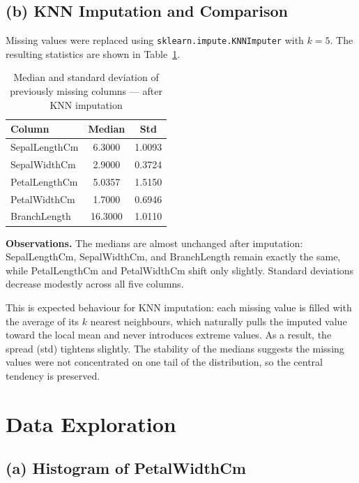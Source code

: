 \documentclass[11pt,a4paper]{article}
\begin{document}
\subsection{(b) KNN Imputation and Comparison}

Missing values were replaced using \texttt{sklearn.impute.KNNImputer} with $k = 5$. The resulting statistics are shown in Table~\ref{tab:after_imputation}.

\begin{table}[H]
\centering
\caption{Median and standard deviation of previously missing columns --- after KNN imputation}
\label{tab:after_imputation}
\begin{tabular}{lcc}
\toprule
\textbf{Column} & \textbf{Median} & \textbf{Std} \\
\midrule
SepalLengthCm  & 6.3000 & 1.0093 \\
SepalWidthCm   & 2.9000 & 0.3724 \\
PetalLengthCm  & 5.0357 & 1.5150 \\
PetalWidthCm   & 1.7000 & 0.6946 \\
BranchLength   & 16.3000 & 1.0110 \\
\bottomrule
\end{tabular}
\end{table}

\textbf{Observations.}
The medians are almost unchanged after imputation: SepalLengthCm, SepalWidthCm, and BranchLength remain exactly the same, while PetalLengthCm and PetalWidthCm shift only slightly. Standard deviations decrease modestly across all five columns.

This is expected behaviour for KNN imputation: each missing value is filled with the average of its $k$ nearest neighbours, which naturally pulls the imputed value toward the local mean and never introduces extreme values. As a result, the spread (std) tightens slightly. The stability of the medians suggests the missing values were not concentrated on one tail of the distribution, so the central tendency is preserved.

\section{Data Exploration}

\subsection{(a) Histogram of PetalWidthCm}
\end{document}
